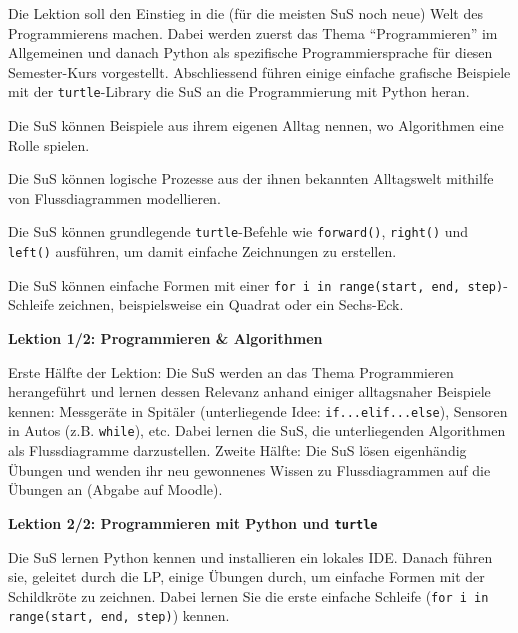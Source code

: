 \begin{myExBox}
Die Lektion soll den Einstieg in die (für die meisten SuS noch neue) Welt des Programmierens machen. Dabei werden zuerst das Thema ``Programmieren'' im Allgemeinen und danach Python als spezifische Programmiersprache für diesen Semester-Kurs vorgestellt. Abschliessend führen einige einfache grafische Beispiele mit der \lstinline|turtle|-Library die SuS an die Programmierung mit Python heran.


\begin{todolist}
    \item Die SuS können Beispiele aus ihrem eigenen Alltag nennen, wo Algorithmen eine Rolle spielen.
    \item Die SuS können logische Prozesse aus der ihnen bekannten Alltagswelt mithilfe von Flussdiagrammen modellieren.
    \item Die SuS können grundlegende \lstinline|turtle|-Befehle wie \lstinline|forward()|, \lstinline|right()| und \lstinline|left()| ausführen, um damit einfache Zeichnungen zu erstellen.
    \item Die SuS können einfache Formen mit einer \lstinline|for i in range(start, end, step)|-Schleife zeichnen, beispielsweise ein Quadrat oder ein Sechs-Eck.
\end{todolist}

\textbf{Lektion 1/2: Programmieren \& Algorithmen}

Erste Hälfte der Lektion: Die SuS werden an das Thema Programmieren herangeführt und lernen dessen Relevanz anhand einiger alltagsnaher Beispiele kennen: Messgeräte in Spitäler (unterliegende Idee: \lstinline|if...elif...else|), Sensoren in Autos (z.B. \lstinline|while|), etc. Dabei lernen die SuS, die unterliegenden Algorithmen als Flussdiagramme darzustellen. Zweite Hälfte: Die SuS lösen eigenhändig Übungen und wenden ihr neu gewonnenes Wissen zu Flussdiagrammen auf die Übungen an (Abgabe auf Moodle).

\textbf{Lektion 2/2: Programmieren mit Python und \lstinline|turtle|}

Die SuS lernen Python kennen und installieren ein lokales IDE. Danach führen sie, geleitet durch die LP, einige Übungen durch, um einfache Formen mit der Schildkröte zu zeichnen. Dabei lernen Sie die erste einfache Schleife (\lstinline|for i in range(start, end, step)|) kennen.


\end{myExBox}
